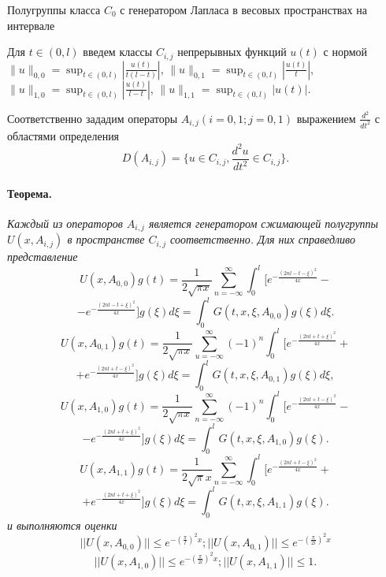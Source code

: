 \documentclass{vzmsthesis}
\begin{document}


{
	Полугруппы класса $C_0$ с генератором Лапласа в весовых пространствах на интервале
}


\vzmscaption

Для $t\in(0,l)$ введем классы $C_{i,j}$ непрерывных функций $u(t)$ с нормой
$  \|u\|_{0,0}=\sup_{t\in(0,l)} |\frac{u(t)}{t(l-t)}|$, $\|u\|_{0,1}=\sup_{t\in(0,l)} |\frac{u(t)}{t}|$, $\|u\|_{1,0}=\sup_{t\in(0,l)} |\frac{u(t)}{l-t}|$, $\|u\|_{1,1}=\sup_{t\in(0,l)} |u(t)|$.

Соответственно зададим операторы $A_{i, j}(i = 0, 1; j = 0, 1)$
 выражением $\frac{d^2}{dt^2}$ с областями
определения $$D(A_{i, j}) = \{ u \in C_{i, j},
\frac{d^2u}{dt^2} \in C_{i, j} \}.$$
\paragraph{Теорема.} {\it
	Каждый из операторов $A_{i,j}$ является генератором сжимающей полугруппы
$U(x,A_{i,j})$ в пространстве $C_{i,j}$ соответственно. Для них справедливо представление
$$
U(x,A_{0,0})g(t)=\frac{1}{2\sqrt{\pi x}}\sum_{n=-\infty}^{\infty}\int_{0}^{l}[e^{-\frac{(2nl-t-\xi)^2}{4x}}-
$$
$$-e^{-\frac{(2nl-t+\xi)^2}{4x}}]g(\xi)d\xi=\int_{0}^{l}G(t,x,\xi,A_{0,0})g(\xi)d\xi.$$
$$U(x,A_{0,1})g(t)=\frac{1}{2\sqrt{\pi
x}}\sum_{u=-\infty}^{\infty}(-1)^{n}\int_{0}^{l}[e^{-\frac{(2nl+t+\xi)^2}{4x}}+$$ $$+e^{-\frac{(2nl+t-\xi)^2}{4x}}]g(\xi)d\xi=
\int_{0}^{l}G(t,x,\xi,A_{0,1})g(\xi)d\xi,$$
$$U(x,A_{1,0})g(t)=\frac{1}{2\sqrt{\pi x}}\sum_{n=-\infty}^{\infty}(-1)^n\int_{0}^{l}[e^{-\frac{(2nl+t-\xi)^2}{4x}}
-$$ $$- e^{-\frac{(2nl+t+\xi)^2}{4x}}]g(\xi)d\xi=\int_{0}^{l}G(t,x,\xi,A_{1,0})g(\xi).$$ $$
U(x,A_{1,1})g(t)=\frac{1}{2\sqrt{\pi}x}\sum_{n=-\infty}^{\infty}
\int_{0}^{l}[e^{-\frac{(2nl+t-\xi)^2}{4x}}+$$ $$+e^{-\frac{(2nl+t+\xi)^2}{4x}}]g(\xi)d\xi=\int_{0}^{l}G(t,x,\xi,A_{1,1})g(\xi).$$
 и выполняются оценки
 $$
||U(x,A_{0,0})||\leq e^{-(\frac{\pi}{l})^{2}x};||U(x,A_{0,1})||\leq e^{-(\frac{\pi}{2l})^{2}x}$$
$$||U(x,A_{1,0})||\leq e^{-(\frac{\pi}{2l})^{2}x};||U(x,A_{1,1})||\leq
1.$$}
 
\end{document}
